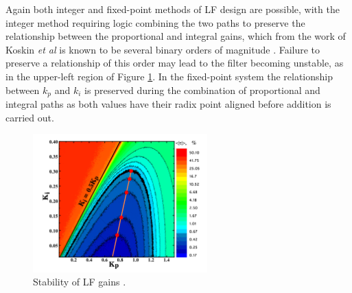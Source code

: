 Again both integer and fixed-point methods of \ac{LF} design are possible, with the integer method requiring logic combining the two paths to preserve the relationship between the proportional and integral gains, which from the work of Koskin \textit{et al} is known to be several binary orders of magnitude \cite{koskin2018generation}. Failure to preserve a relationship of this order may lead to the filter becoming unstable, as in the upper-left region of Figure \ref{fig:gain_grid}. In the fixed-point system the relationship between $k_p$ and $k_i$ is preserved during the combination of proportional and integral paths as both values have their radix point aligned before addition is carried out.
\begin{figure}[h]
	\centering
	\includegraphics[width=0.6\textwidth]{../eugene}
	\caption[Stability of \acl{LF} gains]{Stability of \acl{LF} gains \cite{koskin2018generation}.}
	\label{fig:gain_grid}
\end{figure}